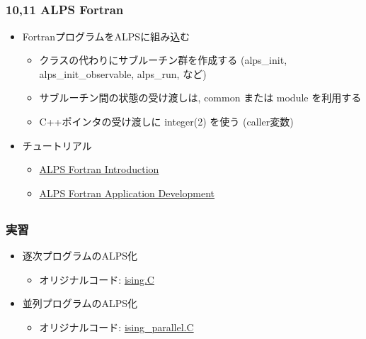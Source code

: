 \subsection*{\redm\whitem\greenb}
\begin{frame}[fragile]
  \frametitle{10,11 ALPS Fortran}
  \begin{itemize}
  \item FortranプログラムをALPSに組み込む
    \begin{itemize}
      \item クラスの代わりにサブルーチン群を作成する (alps\_init, alps\_init\_observable, alps\_run, など)
      \item サブルーチン間の状態の受け渡しは, common または module を利用する
      \item C++ポインタの受け渡しに integer(2) を使う (caller変数)
    \end{itemize}
  \item チュートリアル
  \begin{itemize}
    \item \href{http://alps.comp-phys.org/mediawiki/index.php/Tutorials:ALPS_Fortran_Introduction/ja}{ALPS Fortran Introduction}
    \item \href{http://alps.comp-phys.org/mediawiki/index.php/Tutorials:ALPS_Fortran_Application_Development/ja}{ALPS Fortran Application Development}
  \end{itemize}
  \end{itemize}
\end{frame}

\subsection*{\redm\whitem\greenb}
\begin{frame}[fragile]
  \frametitle{実習}
  \begin{itemize}
    \setlength{\itemsep}{1em}
  \item 逐次プログラムのALPS化
    \begin{itemize}
      \item オリジナルコード: \href{https://github.com/cmsi/alps-tutorial/blob/develop/alpsize/ising.C}{ising.C}
    \end{itemize}
  \item 並列プログラムのALPS化
    \begin{itemize}
      \item オリジナルコード: \href{https://github.com/cmsi/alps-tutorial/blob/develop/alpsize/ising_parallel.C}{ising\_parallel.C}
    \end{itemize}
  \end{itemize}
\end{frame}


